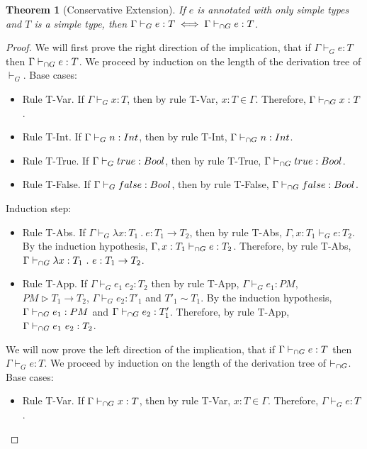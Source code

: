 \documentclass[a4paper]{article}
\newtheorem{theorem}{Theorem}[section]
\begin{document}
\begin{theorem}[Conservative Extension]
\label{conservative_extension_intersection_type_system}
If $e$ is annotated with only simple types and $T$ is a simple type, then $\Gamma \vdash_{G} e : T \iff \Gamma \vdash_{\cap G} e : T$.
\end{theorem}
\begin{proof}
We will first prove the right direction of the implication, that if $\Gamma \vdash_{G} e : T$ then $\Gamma \vdash_{\cap G} e : T$.
We proceed by induction on the length of the derivation tree of $\vdash_{G}$.
Base cases:
\begin{itemize}
    \item Rule T-Var.
    If $\Gamma \vdash_{G} x : T$, then by rule T-Var, $x : T \in \Gamma$.
    Therefore, $\Gamma \vdash_{\cap G} x : T$.
    \item Rule T-Int.
    If $\Gamma \vdash_{G} n : {Int}$, then by rule T-Int, $\Gamma \vdash_{\cap G} n : {Int}$.
    \item Rule T-True.
    If $\Gamma \vdash_{G} true : Bool$, then by rule T-True, $\Gamma \vdash_{\cap G} true : Bool$.
    \item Rule T-False.
    If $\Gamma \vdash_{G} false : Bool$, then by rule T-False, $\Gamma \vdash_{\cap G} false : Bool$.
\end{itemize}
Induction step:
\begin{itemize}
    \item Rule T-Abs.
    If $\Gamma \vdash_{G} \lambda x : T_1\ .\ e : T_1 \rightarrow T_2$, then by rule T-Abs, $\Gamma, x : T_1 \vdash_{G} e : T_2$.
        By the induction hypothesis, $\Gamma, x : T_1 \vdash_{\cap G} e : T_2$.
        Therefore, by rule T-Abs, $\Gamma \vdash_{\cap G} \lambda x : T_1\ .\ e : T_1 \rightarrow T_2$.
    \item Rule T-App.
    If $\Gamma \vdash_{G} e_1\ e_2 : T_2$ then by rule T-App, $\Gamma \vdash_{G} e_1 : PM$, $PM \rhd T_1 \rightarrow T_2$, $\Gamma \vdash_{G} e_2 : T'_1$ and $T'_1 \sim T_1$.
        By the induction hypothesis, $\Gamma \vdash_{\cap G} e_1 : PM$ and $\Gamma \vdash_{\cap G} e_2 : T_1'$.
        Therefore, by rule T-App, $\Gamma \vdash_{\cap G} e_1\ e_2 : T_2$.
\end{itemize}
We will now prove the left direction of the implication, that if $\Gamma \vdash_{\cap G} e : T$ then $\Gamma \vdash_{G} e : T$.
We proceed by induction on the length of the derivation tree of $\vdash_{\cap G}$.
Base cases:
\begin{itemize}
    \item Rule T-Var.
    If $\Gamma \vdash_{\cap G} x : T$, then by rule T-Var, $x : T \in \Gamma$.
    Therefore, $\Gamma \vdash_{G} e : T$.

\end{itemize}
\end{proof}
\end{document}
